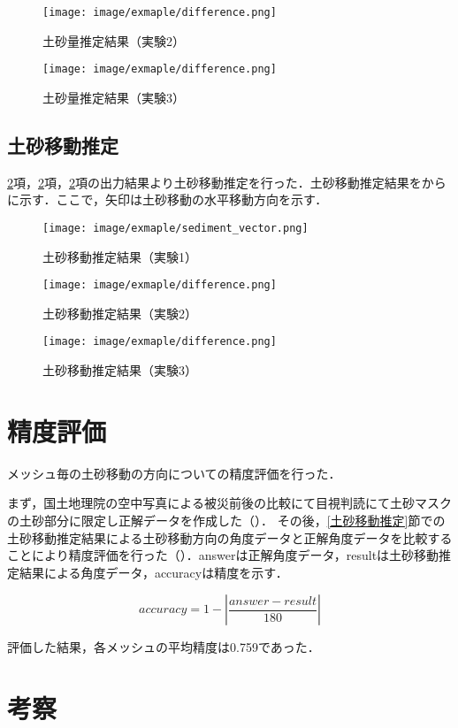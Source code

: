       \begin{figure}[t]
        \centering
        \texttt{[image: image/exmaple/difference.png]}
        \caption{土砂量推定結果（実験2）}
      \end{figure}

      \begin{figure}[t]
        \centering
        \texttt{[image: image/exmaple/difference.png]}
        \caption{土砂量推定結果（実験3）}
        \label{土砂量推定結果（実験3）}
      \end{figure}


    \subsection{土砂移動推定}
      \ref{}項，\ref{}項，\ref{}項の出力結果より土砂移動推定を行った．土砂移動推定結果をからに示す．ここで，矢印は土砂移動の水平移動方向を示す．

      \begin{figure}[t]
        \centering
        \texttt{[image: image/exmaple/sediment\_vector.png]}
        \caption{土砂移動推定結果（実験1）}
        \label{土砂移動推定結果（実験1）}
      \end{figure}

      \begin{figure}[t]
        \centering
        \texttt{[image: image/exmaple/difference.png]}
        \caption{土砂移動推定結果（実験2）}
      \end{figure}

      \begin{figure}[t]
        \centering
        \texttt{[image: image/exmaple/difference.png]}
        \caption{土砂移動推定結果（実験3）}
        \label{土砂移動推定結果（実験3）}
      \end{figure}


  \section{精度評価}
    メッシュ毎の土砂移動の方向についての精度評価を行った．

    まず，国土地理院の空中写真による被災前後の比較\cite{国土地理院空撮画像1, 国土地理院空撮画像2}にて目視判読にて土砂マスクの土砂部分に限定し正解データを作成した（\fref{}）． その後，\ref{土砂移動推定}節での土砂移動推定結果による土砂移動方向の角度データと正解角度データを比較することにより精度評価を行った（）．answerは正解角度データ，resultは土砂移動推定結果による角度データ，accuracyは精度を示す．
    
    \begin{equation}
      \label{精度評価}
      accuracy = 1 - |\dfrac{answer - result} {180}|
    \end{equation}

    評価した結果，各メッシュの平均精度は0.759であった．


    
  \section{考察}
